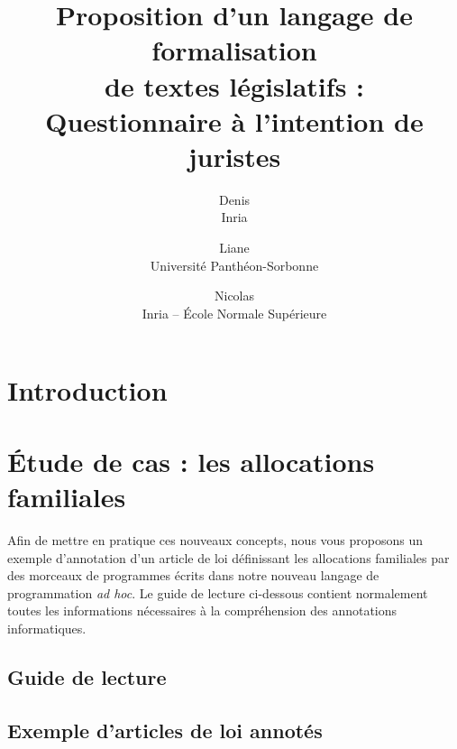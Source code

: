 \documentclass[12pt, french]{article}
\title{
  Proposition d'un langage de formalisation\\
  de textes législatifs :\\
  Questionnaire à l'intention de juristes
}
\author{
  Denis \bsc{Merigoux}\\Inria\and
  Liane \bsc{Huttner}\\Université Panthéon-Sorbonne\and
  Nicolas \bsc{Chataing}\\Inria -- École Normale Supérieure\and
}
\begin{document}
\maketitle

\renewcommand{\contentsname}{Sommaire}
\tableofcontents

\section{Introduction}



\section{Étude de cas : les allocations familiales}
Afin de mettre en pratique ces nouveaux concepts, nous vous proposons un exemple d'annotation d'un article de loi  définissant les allocations familiales par des morceaux de programmes écrits dans notre nouveau langage de programmation \emph{ad hoc}. Le guide de lecture ci-dessous contient normalement toutes les informations nécessaires à la compréhension des annotations informatiques.

\subsection{Guide de lecture}



\subsection{Exemple d'articles de loi annotés}
\end{document}
